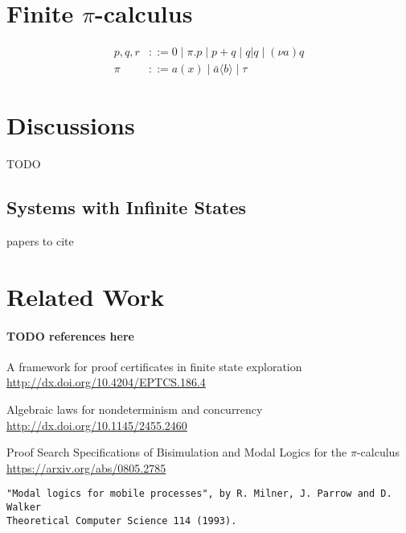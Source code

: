 \documentclass{llncs}
\begin{document}
\section{Finite $\pi$-calculus}\label{sec:pic}
\begin{align*}
p,q,r &::= 0 \mid \pi.p \mid p + q \mid q|q \mid (\nu a)q \\
\pi &::= a(x) \mid \bar a\langle b \rangle  \mid\tau
\end{align*}

\section{Discussions}
TODO
\subsection{Systems with Infinite States}
papers to cite


\section{Related Work}


\paragraph{TODO references here}
A framework for proof certificates in finite state exploration\\
\url{http://dx.doi.org/10.4204/EPTCS.186.4}

Algebraic laws for nondeterminism and concurrency\\
\url{http://dx.doi.org/10.1145/2455.2460}

Proof Search Specifications of Bisimulation and Modal Logics for the $\pi$-calculus\\
\url{https://arxiv.org/abs/0805.2785}

\begin{verbatim}
"Modal logics for mobile processes", by R. Milner, J. Parrow and D. Walker
Theoretical Computer Science 114 (1993).
\end{verbatim}
\end{document}

